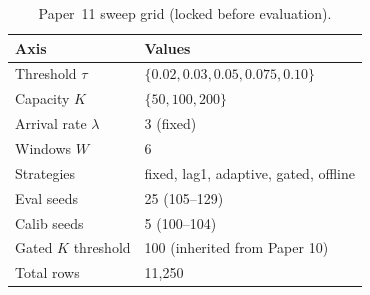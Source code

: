 \begin{table}[!t]
  \caption{Paper~11 sweep grid (locked before evaluation).}
  \label{tab:grid}
  \centering
  \small
  \setlength{\tabcolsep}{4pt}
  \begin{tabular}{@{}p{2.6cm}p{4.9cm}@{}}
    \toprule
    \textbf{Axis} & \textbf{Values} \\
    \midrule
    Threshold $\tau$ & $\{0.02, 0.03, 0.05, 0.075, 0.10\}$ \\
    Capacity $K$ & $\{50, 100, 200\}$ \\
    Arrival rate $\lambda$ & 3 (fixed) \\
    Windows $W$ & 6 \\
    Strategies & fixed, lag1, adaptive, gated, offline \\
    Eval seeds & 25 (105--129) \\
    Calib seeds & 5 (100--104) \\
    Gated $K$ threshold & 100 (inherited from Paper 10) \\
    \midrule
    Total rows & 11{,}250 \\
    \bottomrule
  \end{tabular}
\end{table}
